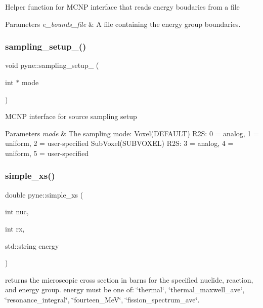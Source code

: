 Helper function for M\+C\+NP interface that reads energy boudaries from a file 
\begin{DoxyParams}{Parameters}
{\em e\+\_\+bounds\+\_\+file} & A file containing the energy group boundaries. \\
\hline
\end{DoxyParams}
\mbox{\label{namespacepyne_a4b568e0d7793942733d5403116ddc00f}} 
\subsubsection{\texorpdfstring{sampling\+\_\+setup\+\_\+()}{sampling\_setup\_()}}
{\footnotesize\ttfamily void pyne\+::sampling\+\_\+setup\+\_\+ (\begin{DoxyParamCaption}\item[{int $\ast$}]{mode }\end{DoxyParamCaption})}

M\+C\+NP interface for source sampling setup 
\begin{DoxyParams}{Parameters}
{\em mode} & The sampling mode\+: Voxel(\+D\+E\+F\+A\+U\+L\+T) R2S\+: 0 = analog, 1 = uniform, 2 = user-\/specified Sub\+Voxel(\+S\+U\+B\+V\+O\+X\+E\+L) R2S\+: 3 = analog, 4 = uniform, 5 = user-\/specified \\
\hline
\end{DoxyParams}
\mbox{\label{namespacepyne_abde9d0cbfe70fd1a75a7cb2d1f59e1f1}} 
\subsubsection{\texorpdfstring{simple\+\_\+xs()}{simple\_xs()}\hspace{0.1cm}{\footnotesize\ttfamily [1/4]}}
{\footnotesize\ttfamily double pyne\+::simple\+\_\+xs (\begin{DoxyParamCaption}\item[{int}]{nuc,  }\item[{int}]{rx,  }\item[{std\+::string}]{energy }\end{DoxyParamCaption})}

returns the microscopic cross section in barns for the specified nuclide, reaction, and energy group. energy must be one of\+: \char`\"{}thermal\char`\"{}, \char`\"{}thermal\+\_\+maxwell\+\_\+ave\char`\"{}, \char`\"{}resonance\+\_\+integral\char`\"{}, \char`\"{}fourteen\+\_\+\+Me\+V\char`\"{}, \char`\"{}fission\+\_\+spectrum\+\_\+ave\char`\"{}. \mbox{\label{namespacepyne_ab10ec6870a2330af652b07b4dc6dcb27}} 
